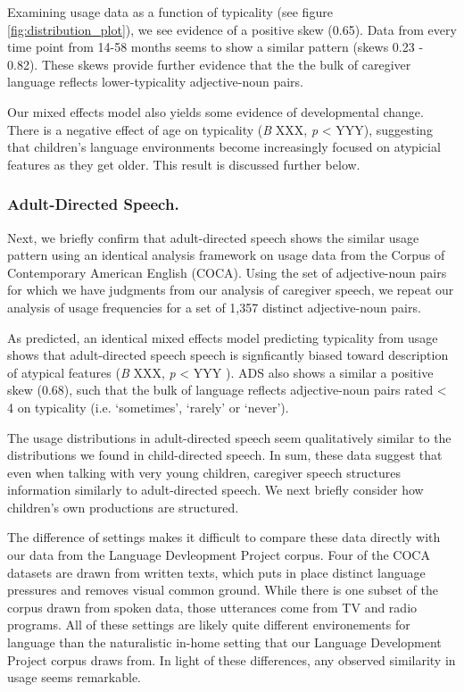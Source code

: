 \documentclass[10pt, letterpaper]{article}
\begin{document}
Examining usage data as a function of typicality (see figure
\ref{fig:distribution_plot}), we see evidence of a positive skew (0.65).
Data from every time point from 14-58 months seems to show a similar
pattern (skews 0.23 - 0.82). These skews provide further evidence that
the the bulk of caregiver language reflects lower-typicality
adjective-noun pairs.

Our mixed effects model also yields some evidence of developmental
change. There is a negative effect of age on typicality (\emph{B} XXX,
\emph{p} \textless{} YYY), suggesting that children's language
environments become increasingly focused on atypicial features as they
get older. This result is discussed further below.

\hypertarget{adult-directed-speech.}{%
\subsubsection{Adult-Directed Speech.}\label{adult-directed-speech.}}

Next, we briefly confirm that adult-directed speech shows the similar
usage pattern using an identical analysis framework on usage data from
the Corpus of Contemporary American English (COCA). Using the set of
adjective-noun pairs for which we have judgments from our analysis of
caregiver speech, we repeat our analysis of usage frequencies for a set
of 1,357 distinct adjective-noun pairs.

As predicted, an identical mixed effects model predicting typicality
from usage shows that adult-directed speech speech is signficantly
biased toward description of atypical features (\emph{B} XXX, \emph{p}
\textless{} YYY ). ADS also shows a similar a positive skew (0.68), such
that the bulk of language reflects adjective-noun pairs rated
\textless{} 4 on typicality (i.e. `sometimes', `rarely' or `never').

The usage distributions in adult-directed speech seem qualitatively
similar to the distributions we found in child-directed speech. In sum,
these data suggest that even when talking with very young children,
caregiver speech structures information similarly to adult-directed
speech. We next briefly consider how children's own productions are
structured.

The difference of settings makes it difficult to compare these data
directly with our data from the Language Devleopment Project corpus.
Four of the COCA datasets are drawn from written texts, which puts in
place distinct language pressures and removes visual common ground.
While there is one subset of the corpus drawn from spoken data, those
utterances come from TV and radio programs. All of these settings are
likely quite different environements for language than the naturalistic
in-home setting that our Language Development Project corpus draws from.
In light of these differences, any observed similarity in usage seems
remarkable.
\end{document}
